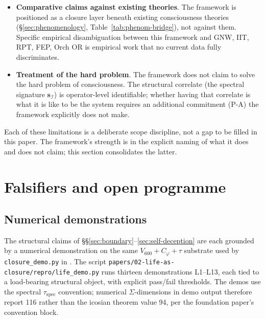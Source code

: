 \documentclass[11pt]{article}
\theoremstyle{plain}
\theoremstyle{definition}
\theoremstyle{remark}
\newcommand{\Ical}{\mathcal{I}}
\newcommand{\Cph}{C_\varphi}
\begin{document}
\begin{itemize}[leftmargin=2em]
\item \textbf{Comparative claims against existing theories}. The framework is positioned as a closure layer beneath existing consciousness theories (\S\ref{sec:phenomenology}, Table~\ref{tab:phenom-bridge}), not against them. Specific empirical disambiguation between this framework and GNW, IIT, RPT, FEP, Orch OR is empirical work that no current data fully discriminates.
\item \textbf{Treatment of the hard problem}. The framework does not claim to solve the hard problem of consciousness. The structural correlate (the spectral signature $\mathbf{s}_\Ical$) is operator-level identifiable; whether having that correlate is what it is like to be the system requires an additional commitment (P-A) the framework explicitly does not make.
\end{itemize}

Each of these limitations is a deliberate scope discipline, not a gap to be filled in this paper. The framework's strength is in the explicit naming of what it does and does not claim; this section consolidates the latter.

\section{Falsifiers and open programme}\label{sec:falsifiers}

\subsection{Numerical demonstrations}\label{sec:numerical-demos}

The structural claims of \S\S\ref{sec:boundary}--\ref{sec:self-deception} are each grounded by a numerical demonstration on the same $V_{600} + \Cph + \tau$ substrate used by \texttt{closure\_demo.py} in \citet{SmartExistenceClosure}. The script \texttt{papers/02-life-as-closure/repro/life\_demo.py} runs thirteen demonstrations L1--L13, each tied to a load-bearing structural object, with explicit pass/fail thresholds. The demos use the spectral $\tau_{\mathrm{spec}}$ convention; numerical $\Sigma$-dimensions in demo output therefore report 116 rather than the icosian theorem value 94, per the foundation paper's convention block.
\end{document}
